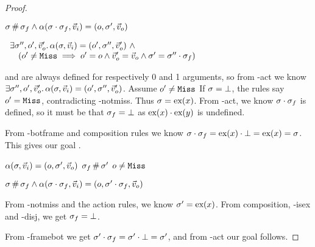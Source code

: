 \begin{proof}

\pfassume \begin{hypvlist}
 $\sigma\operatorname{\#}\sigma_f \land \alpha(\sigma\cdot\sigma_f,\vec{v}_i)=(o,\sigma',\vec{v}_o)$
\end{hypvlist}
\pfprove \begin{goalvlist}
 $\begin{array}{l}
\exists \sigma'', o', \vec{v}_o'\ldotp \alpha(\sigma,\vec{v}_i)=(o', \sigma'', \vec{v}_o') ~\land \\
\quad(o' \neq \texttt{Miss} \implies o' = o \land  \vec{v}_o' = \vec{v}_o \land \sigma' = \sigma'' \cdot \sigma_f)
\end{array}$
\end{goalvlist}
\begin{hypvlist}
	 \load{} and \store{} are always defined for respectively 0 and 1 arguments, so from \hyp{act} we know $\exists \sigma'', o', \vec{v}_o'\ldotp \alpha(\sigma,\vec{v}_i)=(o', \sigma'', \vec{v}_o')$.
	 Assume $o'\neq\texttt{Miss}$
	 If $\sigma=\bot$, the rules say $o'=\texttt{Miss}$, contradicting \hyp{notmiss}. Thus $\sigma=\text{ex}(x)$.
	 From \hyp{act}, we know $\sigma\cdot\sigma_f$ is defined, so it must be that $\sigma_f=\bot$ as $\text{ex}(x)\cdot\text{ex}(y)$ is undefined.
\end{hypvlist}
From \hyp{botframe} and composition rules we know $\sigma\cdot\sigma_f=\text{ex}(x)\cdot\bot=\text{ex}(x)=\sigma$. This gives our goal .


\pfassume \begin{hypvlist}
 $\alpha(\sigma,\vec{v}_i)=(o,\sigma',\vec{v}_o)$
 $\sigma_f\operatorname{\#}\sigma'$
 $o\neq\texttt{Miss}$
\end{hypvlist}
\pfprove \begin{goalvlist}
 $\sigma \operatorname{\#} \sigma_f \land \alpha(\sigma\cdot\sigma_f, \vec{v}_i)=(o, \sigma'\cdot\sigma_f, \vec{v}_o)$	
\end{goalvlist}
\begin{hypvlist}
 From \hyp{notmiss} and the action rules, we know $\sigma'=\text{ex}(x)$.
 From composition, \hyp{isex} and \hyp{disj}, we get $\sigma_f=\bot$.
\end{hypvlist}
From \hyp{framebot} we get $\sigma'\cdot\sigma_f=\sigma'\cdot\bot=\sigma'$, and from \hyp{act} our goal  follows.



\end{proof}
